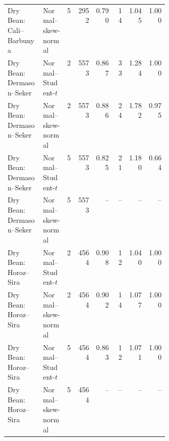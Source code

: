 \begin{longtable}{p{0.22\linewidth}p{0.15\linewidth}rrrrrr}
Dry Bean: Cali--Barbunya & Normal--skew-normal & 5 & 2952 & 0.790 & 14 & 1.045 & 1.000 \\
Dry Bean: Dermason--Seker & Normal--Student-$t$ & 2 & 5573 & 0.867 & 33 & 1.284 & 1.000 \\
Dry Bean: Dermason--Seker & Normal--skew-normal & 2 & 5573 & 0.886 & 24 & 1.782 & 0.975 \\
Dry Bean: Dermason--Seker & Normal--Student-$t$ & 5 & 5573 & 0.825 & 21 & 1.180 & 0.664 \\
Dry Bean: Dermason--Seker & Normal--skew-normal & 5 & 5573 & -- & -- & -- & -- \\
Dry Bean: Horoz--Sira & Normal--Student-$t$ & 2 & 4564 & 0.908 & 12 & 1.040 & 1.000 \\
Dry Bean: Horoz--Sira & Normal--skew-normal & 2 & 4564 & 0.902 & 14 & 1.077 & 1.000 \\
Dry Bean: Horoz--Sira & Normal--Student-$t$ & 5 & 4564 & 0.863 & 12 & 1.071 & 1.000 \\
Dry Bean: Horoz--Sira & Normal--skew-normal & 5 & 4564 & -- & -- & -- & -- \\
\bottomrule
\end{longtable}
\endgroup


